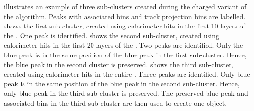 



 illustrates an example of three sub-clusters created during the charged variant of the \peakFinding algorithm. Peaks with associated bins and track projection bins are labelled.  shows the first sub-cluster, created using calorimeter hits  in the first 10 layers of the \ECAL. One peak is identified.  shows the second sub-cluster, created using calorimeter hits in the first 20 layers of the \ECAL. Two peaks are identified. Only the blue peak is in the same position of the blue peak in the first sub-cluster. Hence, the blue peak in the second cluster is preserved.  shows the third sub-cluster, created using calorimeter hits in the entire \ECAL. Three peaks are identified. Only blue  peak is in the  same position of the blue peak in the second sub-cluster. Hence, only blue  peak in the third sub-cluster is preserved. The preserved blue peak and associated bins in the third sub-cluster are then used to create one \ShowerPeak object.


